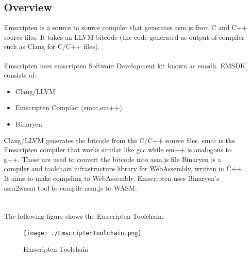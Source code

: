 \documentclass[12pt]{article}
\begin{document}
\subsection{Overview}
Emscripten is a source to source compiler that generates asm.js from C and C++ source files. It takes an LLVM bitcode (the code generated as output of compiler such as Clang for C/C++ files).
\\
\\
Emscripten uses emscripten Software Development kit known as emsdk.
EMSDK consists of:
\begin{itemize}
 \item Clang/LLVM
 \item Emscripten Compiler (emcc,em++)
 \item Binaryen \\
\end{itemize}
Clang/LLVM generates the bitcode from the C/C++ source files. emcc is the Emscripten compiler that works similar like gcc while em++ is analogous to g++. These are used to convert the bitcode into asm.js file Binaryen is a compiler and toolchain infrastructure library for WebAssembly, written in C++. It aims to make compiling to WebAssembly. Emscripten uses Binaryen’s asm2wasm tool to compile asm.js to WASM. \cite{EmscriptenCommon}\\
\\
\\
The following figure shows the Emscripten Toolchain.
\begin{figure}[ht]
 \centering
 \texttt{[image: ./EmscriptenToolchain.png]}
 \caption{Emscripten Toolchain\label{fig:EmscriptenToolchain}}
\end{figure}
\pagebreak
\end{document}
